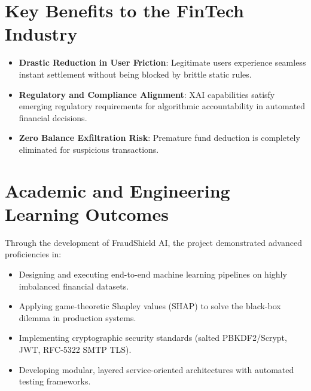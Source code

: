 \section{Key Benefits to the FinTech Industry}
\begin{itemize}
    \item \textbf{Drastic Reduction in User Friction}: Legitimate users experience seamless instant settlement without being blocked by brittle static rules.
    \item \textbf{Regulatory and Compliance Alignment}: XAI capabilities satisfy emerging regulatory requirements for algorithmic accountability in automated financial decisions.
    \item \textbf{Zero Balance Exfiltration Risk}: Premature fund deduction is completely eliminated for suspicious transactions.
\end{itemize}

\section{Academic and Engineering Learning Outcomes}
Through the development of FraudShield AI, the project demonstrated advanced proficiencies in:
\begin{itemize}
    \item Designing and executing end-to-end machine learning pipelines on highly imbalanced financial datasets.
    \item Applying game-theoretic Shapley values (SHAP) to solve the black-box dilemma in production systems.
    \item Implementing cryptographic security standards (salted PBKDF2/Scrypt, JWT, RFC-5322 SMTP TLS).
    \item Developing modular, layered service-oriented architectures with automated testing frameworks.
\end{itemize}
